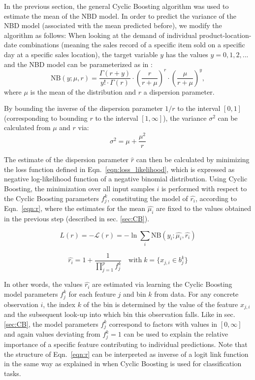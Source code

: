 \documentclass[BCOR=1mm, DIV=calc,10pt,
twoside=true,
twocolumn,
headings=normal]{scrartcl}
\newcommand{\eqn}{Eqn.~}
\begin{document}
In the previous section, the general Cyclic Boosting algorithm was used to estimate the mean of the NBD model. In order to predict the variance of the NBD model (associated with the mean predicted before), we modify the algorithm as follows: When looking at the demand of individual product-location-date combinations (meaning the sales record of a specific item sold on a specific day at a specific sales location), the target variable $y$ has the values $y = 0, 1, 2, ...$ and the NBD model can be parameterized as in \cite{hilbe2011negative}:
\begin{equation} \label{eqn:nbinom}
\mathrm{NB}(y; \mu, r) = \frac{\Gamma(r + y)}{y! \cdot \Gamma(r)} \cdot \left(\frac{r}{r + \mu}\right)^r \cdot \left(\frac{\mu}{r + \mu}\right)^y,
\end{equation}
where $\mu$ is the mean of the distribution and $r$ a dispersion parameter.

By bounding the inverse of the dispersion parameter $1/r$ to the interval $[0, 1]$ (corresponding to bounding $r$ to the interval $[1, \infty]$), the variance $\sigma^2$ can be calculated from $\mu$ and $r$ via:
\begin{equation} \label{eqn:variance_r}
\sigma^2 = \mu + \frac{\mu^2}{r}
\end{equation}

The estimate of the dispersion parameter $\hat{r}$ can then be calculated by minimizing the loss function defined in \eqn \eqref{eqn:loss_likelihood}, which is expressed as negative log-likelihood function of a negative binomial distribution. Using Cyclic Boosting, the minimization over all input samples $i$ is performed with respect to the Cyclic Boosting parameters $f^k_j$, constituting the model of $\hat{r_i}$, according to \eqn \eqref{eqn:r}, where the estimates for the mean $\hat{\mu_i}$ are fixed to the values obtained in the previous step (described in sec. \ref{sec:CB}).

\begin{equation} \label{eqn:loss_likelihood}
L(r) = -\mathcal{L}(r) = -\ln \sum_i \mathrm{NB}(y_i; \hat{\mu_i}, \hat{r_i})
\end{equation}

\begin{equation} \label{eqn:r}
\hat{r_i} = 1 +  \frac{1}{\prod \limits_{j=1}^p f^k_j} \quad \text{with}\; k=\{ x_{j,i} \in b^k_j\}
\end{equation}

In other words, the values $\hat{r_i}$ are estimated via learning the Cyclic Boosting model parameters $f^k_j$ for each feature $j$ and bin $k$ from data. For any concrete observation $i$, the index $k$ of the bin is determined by the value of the feature $x_{j,i}$ and the subsequent look-up into which bin this observation falls. Like in sec. \ref{sec:CB}, the model parameters $f^k_j$ correspond to factors with values in $[0, \infty]$ and again values deviating from $f^k_j=1$ can be used to explain the relative importance of a specific feature contributing to individual predictions. Note that the structure of \eqn \eqref{eqn:r} can be interpreted as inverse of a logit link function in the same way as explained in \cite{Wick2019} when Cyclic Boosting is used for classification tasks.
\end{document}
